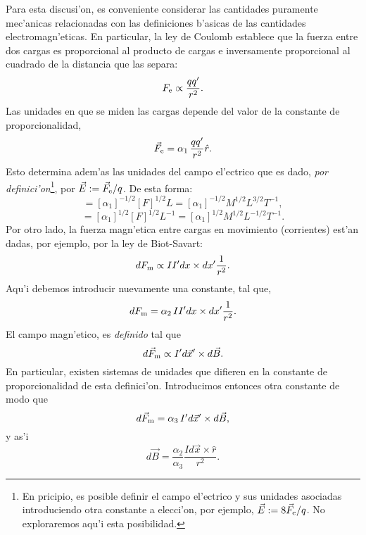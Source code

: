 Para esta discusi'on, es conveniente considerar las cantidades puramente mec'anicas relacionadas con las definiciones b'asicas de las cantidades electromagn'eticas. En particular, la ley de Coulomb establece que la fuerza entre dos cargas es proporcional al producto de cargas e inversamente proporcional al cuadrado de la distancia que las separa:
\begin{equation}
 F_{\rm e}\propto\frac{q q'}{r^2}.
\end{equation} 
Las unidades en que se miden las cargas depende del valor de la constante de proporcionalidad,
\begin{equation}
 \vec{F}_{\rm e}=\alpha_1\,\frac{q q'}{r^2}\hat{r}.
\end{equation} 
Esto determina adem'as las unidades del campo el'ectrico que es dado, \textit{por definici'on}\footnote{En pricipio, es posible definir el campo el'ectrico y sus unidades asociadas introduciendo otra constante a elecci'on, por ejemplo, $\vec{E}:=8 \vec{F}_{\rm e}/q$. No exploraremos aqu'i esta posibilidad.}, por $\vec{E}:=\vec{F}_{\rm e}/q$. De esta forma:
\begin{equation}
 [q]=[\alpha_1]^{-1/2}[F]^{1/2}L =[\alpha_1]^{-1/2}M^{1/2}L^{3/2}T^{-1},
\end{equation}
\begin{equation}
 [E]=[\alpha_1]^{1/2}[F]^{1/2}L^{-1}=[\alpha_1]^{1/2}M^{1/2}L^{-1/2}T^{-1}.
\end{equation}
Por otro lado, la fuerza magn'etica entre cargas en movimiento (corrientes) est'an dadas, por ejemplo, por la ley de Biot-Savart:
\begin{equation}
 dF_{\rm m}\propto II' dx \times dx' \frac{1}{r^2}.
\end{equation}
Aqu'i debemos introducir nuevamente una constante, tal que,
\begin{equation}
 dF_{\rm m}=\alpha_2\, II'dx \times dx' \frac{1}{r^2}. \label{dfe}
\end{equation}
El campo magn'etico, es \textit{definido} tal que
\begin{equation}
 d\vec{F}_{\rm m}\propto I'd\vec{x}' \times d\vec{B}.
\end{equation}
En particular, existen sistemas de unidades que difieren en la constante de proporcionalidad de esta definici'on. Introducimos entonces otra constante de modo que
\begin{equation}\label{dFa3}
 d\vec{F}_{\rm m}=\alpha_3\,I'd\vec{x}' \times d\vec{B},
\end{equation}
y as'i
\begin{equation}
 d\vec{B}=\frac{\alpha_2}{\alpha_3} \frac{Id\vec{x}\times\hat{r}}{r^2}.
\end{equation}
